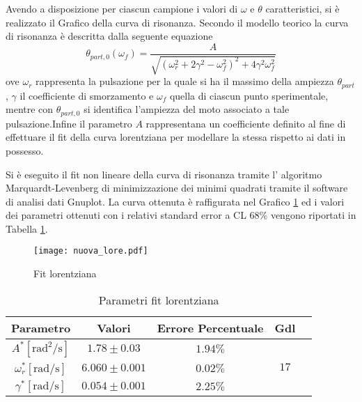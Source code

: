 \documentclass[a4paper,11pt,oneside]{article}
\begin{document}
Avendo a disposizione per ciascun campione i valori di $\omega$ e $\theta$ caratteristici, si è realizzato il Grafico della curva di risonanza. Secondo il modello teorico la curva di risonanza è descritta dalla seguente equazione
\begin{equation*}
    \theta_{part, 0}(\omega_{f}) = \frac{A}{\sqrt{(\omega_{r}^2+ 2\gamma^2-\omega_{f}^2)^2+4\gamma^2\omega_{f}^2}}
\end{equation*}
ove $\omega_{r}$ rappresenta la pulsazione per la quale si ha il massimo della ampiezza $\theta_{part}$, $\gamma$ il coefficiente di smorzamento e $\omega_{f}$ quella di ciascun punto sperimentale, mentre con $\theta_{part,0}$ si identifica l'ampiezza del moto associato a tale pulsazione.Infine il parametro $A$ rappresentana un  coefficiente definito al fine di effettuare il fit della curva lorentziana per modellare la stessa rispetto ai dati in possesso.

Si è eseguito il fit non lineare della curva di risonanza tramite l' algoritmo Marquardt-Levenberg di minimizzazione dei minimi quadrati tramite il software di analisi dati Gnuplot.
La curva ottenuta è raffigurata nel Grafico \ref{fig:lorentziana_root} ed i valori dei parametri ottenuti con i relativi standard error a CL 68\% vengono riportati in Tabella \ref{tab:parametri_fit_lorentziana}. \newline

\begin{figure}[h!]
    \centering
    \texttt{[image: nuova\_lore.pdf]}
    \caption{Fit lorentziana}
    \label{fig:lorentziana_root}
\end{figure}

\begin{table}[h!]
    \centering
    \begin{tabular}{|c|c|c|c|c|}
        \hline
        Parametro & Valori & Errore Percentuale & Gdl \\ \hline
        \cellcolor[rgb]{0.85,0.85,0.85}$A^{\ast}  [ \si{\radian\squared\per\second} ]$ & \cellcolor[rgb]{0.85,0.85,0.85}$1.78\pm0.03$ & \cellcolor[rgb]{0.85,0.85,0.85}$1.94\%$ & \multirow{3}{*}{$17$}  \\ \cline{1-3}
        $\omega_{r}^{\ast} [\si{\radian\per\second}]$ & $6.060\pm0.001$ & $0.02\%$ &  \\ \cline{1-3}
        \cellcolor[rgb]{0.85,0.85,0.85} $\gamma^{\ast} [\si{\radian\per\second}]$& \cellcolor[rgb]{0.85,0.85,0.85}$0.054\pm0.001$ & \cellcolor[rgb]{0.85,0.85,0.85}$2.25\%$ &  \\ \hline
    \end{tabular}
    \caption{Parametri fit lorentziana}
    \label{tab:parametri_fit_lorentziana}
\end{table}
\end{document}
